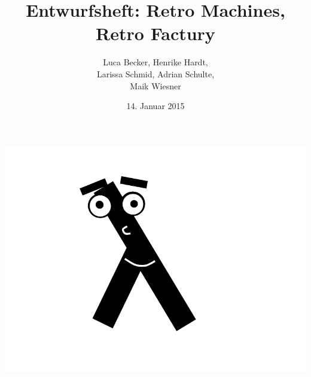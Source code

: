 \documentclass{report}
\begin{document}
\title{Entwurfsheft: Retro Machines, \\ Retro Factury}
\author{Luca Becker, Henrike Hardt,\\Larissa Schmid, Adrian Schulte,\\Maik Wiesner}
\date{14. Januar 2015}
\maketitle
\includegraphics[width=\textwidth]{assets/Lambdolino}
\thispagestyle{empty}

\clearpage

\thispagestyle{empty}
\tableofcontents
\thispagestyle{empty}

\clearpage
\setcounter{page}{1}


	
	
{}
\printglossary[title=Glossar]
\thispagestyle{empty}
\end{document}
